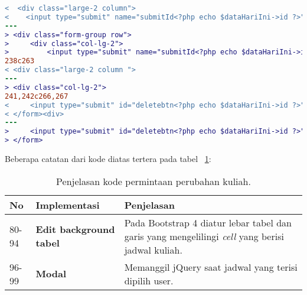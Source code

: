 \begin{lstlisting}[language=diff, caption=Kode untuk Halaman Entri Jadwal Dosen,  basicstyle=\ttfamily, frame=single,
columns=fullflexible, keepspaces=true, breaklines=true, label={lst:mainEntriJadwalDosen}]
<  <div class="large-2 column">
<    <input type="submit" name="submitId<?php echo $dataHariIni->id ?>" class="button" value="Save  ">
---
> <div class="form-group row">
>     <div class="col-lg-2">
>         <input type="submit" name="submitId<?php echo $dataHariIni->id ?>" class="btn btn-primary" value="Save  ">
238c263
< <div class="large-2 column ">
---
> <div class="col-lg-2">
241,242c266,267
<     <input type="submit" id="deletebtn<?php echo $dataHariIni->id ?>" name="deletebtn<?php echo $dataHariIni->id ?>" class="alert button" value="Delete">
< </form><div>
---
>     <input type="submit" id="deletebtn<?php echo $dataHariIni->id ?>" name="deletebtn<?php echo $dataHariIni->id ?>" class="btn btn-danger" value="Delete">
> </form>
\end{lstlisting}

Beberapa catatan dari kode diatas tertera pada tabel ~\ref{tabel:entriJadwalDosen}:
\begin{table}[H]
	\centering
	\caption{Penjelasan kode permintaan perubahan kuliah.}
	\begin{tabularx}{\textwidth}{llX}
		\toprule
		No & Implementasi     & Penjelasan \\
		\midrule
		80-94 & \textbf{Edit background tabel}  & Pada Bootstrap 4 diatur lebar tabel dan garis yang mengelilingi \textit{cell} yang berisi jadwal kuliah.\\
		96-99 & \textbf{Modal}  & Memanggil jQuery saat jadwal yang terisi dipilih user.\\
		\bottomrule
	\end{tabularx}%
	\label{tabel:entriJadwalDosen}
\end{table}

